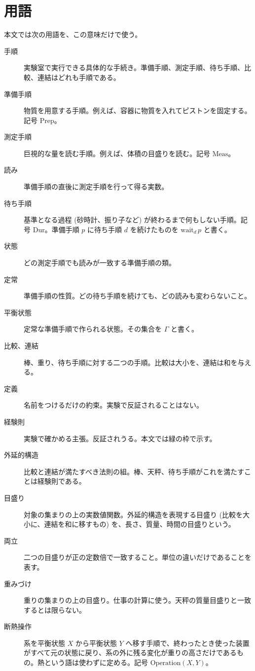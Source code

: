 \section{用語}

本文では次の用語を、この意味だけで使う。

\begin{description}
  \item[手順] 実験室で実行できる具体的な手続き。準備手順、測定手順、待ち手順、比較、連結はどれも手順である。
  \item[準備手順] 物質を用意する手順。例えば、容器に物質を入れてピストンを固定する。記号 $\mathrm{Prep}$。
  \item[測定手順] 巨視的な量を読む手順。例えば、体積の目盛りを読む。記号 $\mathrm{Meas}$。
  \item[読み] 準備手順の直後に測定手順を行って得る実数。
  \item[待ち手順] 基準となる過程 (砂時計、振り子など) が終わるまで何もしない手順。記号 $\mathrm{Dur}$。準備手順 $p$ に待ち手順 $d$ を続けたものを $\mathrm{wait}_d\, p$ と書く。
  \item[状態] どの測定手順でも読みが一致する準備手順の類。
  \item[定常] 準備手順の性質。どの待ち手順を続けても、どの読みも変わらないこと。
  \item[平衡状態] 定常な準備手順で作られる状態。その集合を $\Gamma$ と書く。
  \item[比較、連結] 棒、重り、待ち手順に対する二つの手順。比較は大小を、連結は和を与える。
  \item[定義] 名前をつけるだけの約束。実験で反証されることはない。
  \item[経験則] 実験で確かめる主張。反証されうる。本文では緑の枠で示す。
  \item[外延的構造] 比較と連結が満たすべき法則の組。棒、天秤、待ち手順がこれを満たすことは経験則である。
  \item[目盛り] 対象の集まりの上の実数値関数。外延的構造を表現する目盛り (比較を大小に、連結を和に移すもの) を、長さ、質量、時間の目盛りという。
  \item[両立] 二つの目盛りが正の定数倍で一致すること。単位の違いだけであることを表す。
  \item[重みづけ] 重りの集まりの上の目盛り。仕事の計算に使う。天秤の質量目盛りと一致するとは限らない。
  \item[断熱操作] 系を平衡状態 $X$ から平衡状態 $Y$ へ移す手順で、終わったとき使った装置がすべて元の状態に戻り、系の外に残る変化が重りの高さだけであるもの。熱という語は使わずに定める。記号 $\mathrm{Operation}(X, Y)$。

\end{description}
